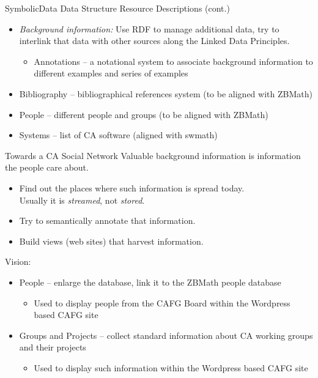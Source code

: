 \documentclass{beamer}
\begin{document}
\begin{frame}{SymbolicData Data Structure}{}
Resource Descriptions (cont.)
\begin{itemize}
\item \emph{Background information:} Use RDF to manage additional data, try to
interlink that data with other sources along the Linked Data Principles.
\begin{itemize}
\item Annotations -- a notational system to associate background information
  to different examples and series of examples
\end{itemize}
\item Bibliography -- bibliographical references system (to be aligned with
  ZBMath)
\item People -- different people and groups (to be aligned with ZBMath)
\item Systems -- list of CA software (aligned with swmath) 
\end{itemize}
\end{frame}

\begin{frame}{Towards a CA Social Network}{}
Valuable background information is information the people care about. 
\begin{itemize}
\item Find out the places where such information is spread today.\\ Usually it
  is \emph{streamed}, not \emph{stored}.
\item Try to semantically annotate that information. 
\item Build views (web sites) that harvest information.
\end{itemize}
Vision:
\begin{itemize}
\item People -- enlarge the database, link it to the ZBMath people database
\begin{itemize}
\item Used to display people from the CAFG Board within the Wordpress based
  CAFG site
\end{itemize}
\item Groups and Projects -- collect standard information about CA working
  groups and their projects
\begin{itemize}
\item Used to display such information within the Wordpress based CAFG site
\end{itemize}
\end{itemize}
\end{frame}
\end{document}

